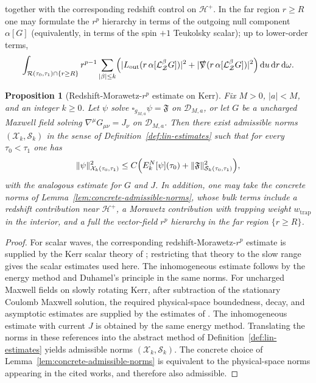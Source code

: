 \documentclass[11pt]{article}
\numberwithin{equation}{section}
\theoremstyle{plain}
\newtheorem{proposition}[theorem]{Proposition}
\theoremstyle{definition}
\theoremstyle{remark}
\newcommand{\dd}{\mathrm{d}}
\begin{document}
together with the corresponding redshift control on $\mathcal H^{+}$.
In the far region $r\ge R$ one may formulate the $r^{p}$ hierarchy in terms of the outgoing null component $\alpha[G]$ (equivalently, in terms of the spin $+1$ Teukolsky scalar); up to lower-order terms,
\begin{equation}\label{eq:kerr-maxwell-rp-structural}
\int_{\mathcal R(\tau_{0},\tau_{1})\cap\{r\ge R\}} r^{p-1}\sum_{|\beta|\le k}\Bigl(
|L_{\mathrm{out}}(r\,\alpha[\mathcal L_{\mathcal Z}^{\beta}G])|^{2}
+
|\slashed{\nabla}(r\,\alpha[\mathcal L_{\mathcal Z}^{\beta}G])|^{2}
\Bigr)\,\dd u\,\dd r\,\dd\omega.
\end{equation}


\begin{proposition}[Redshift-Morawetz-$r^{p}$ estimate on Kerr]\label{prop:kerr-integrated-decay}
Fix $M>0$, $|a|<M$, and an integer $k\ge0$.
Let $\psi$ solve $\square_{g_{M,a}}\psi=\mathfrak{F}$ on $\mathcal D_{M,a}$, or let $G$ be a uncharged Maxwell field solving $\nabla^{\mu}G_{\mu\nu}=J_{\nu}$ on $\mathcal D_{M,a}$.
Then there exist admissible norms $(\mathcal X_{k},\mathcal S_{k})$ in the sense of Definition~\ref{def:lin-estimates} such that for every $\tau_{0}<\tau_{1}$ one has
\begin{equation}
\|\psi\|_{\mathcal X_{k}(\tau_{0},\tau_{1})}^{2}
\le
C\Bigl(E^{N}_{k}[\psi](\tau_{0})+\|\mathfrak{F}\|_{\mathcal S_{k}(\tau_{0},\tau_{1})}^{2}\Bigr),
\end{equation}
with the analogous estimate for $G$ and $J$.
In addition, one may take the concrete norms of Lemma~\ref{lem:concrete-admissible-norms}, whose bulk terms include a redshift contribution near $\mathcal H^{+}$, a Morawetz contribution with trapping weight $w_{\mathrm{trap}}$ in the interior, and a full the vector-field $r^{p}$ hierarchy in the far region $\{r\ge R\}$.
\end{proposition}

\begin{proof}
For scalar waves, the corresponding redshift-Morawetz-$r^{p}$ estimate is supplied by the Kerr scalar theory of \cite[Theorems~3.1 and~3.2]{DRSRKerrIII}; restricting that theory to the slow range gives the scalar estimates used here.  The inhomogeneous estimate follows by the energy method and Duhamel's principle in the same norms.
For uncharged Maxwell fields on slowly rotating Kerr, after subtraction of the stationary Coulomb Maxwell solution, the required physical-space boundedness, decay, and asymptotic estimates are supplied by the estimates of \cite{AnderssonBlueMaxwellSlowKerr}.
The inhomogeneous estimate with current $J$ is obtained by the same energy method.
Translating the norms in these references into the abstract method of Definition~\ref{def:lin-estimates} yields admissible norms $(\mathcal X_k,\mathcal S_k)$.
The concrete choice of Lemma~\ref{lem:concrete-admissible-norms} is equivalent to the physical-space norms appearing in the cited works, and therefore also admissible.
\end{proof}
\end{document}
